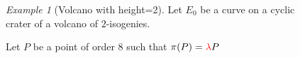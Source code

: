 \documentclass[10pt,a4paper]{beamer}
\theoremstyle{plain}
\theoremstyle{definition}
\theoremstyle{definition}
\theoremstyle{definition}
\theoremstyle{definition}
\theoremstyle{remark}
\theoremstyle{remark}
\newtheorem{exe}[thm]{Example}
\begin{document}
\begin{frame}
\begin{columns}

\begin{column}{4cm}
\begin{exe}[Volcano with height=2]
Let $E_0$ be a curve on a cyclic crater of a volcano of $2$-isogenies.

Let $P$ be a point of order $8$ such that $\pi(P)=\color{red}\lambda \color{black}P$

\begin{itemize}
\end{itemize}


\end{exe}
\end{column}

\begin{column}{7cm}
\begin{figure}[h]
		\begin{center}
		

\end{center}
\end{figure}
\end{column}
\end{columns}
\end{frame}
\end{document}
